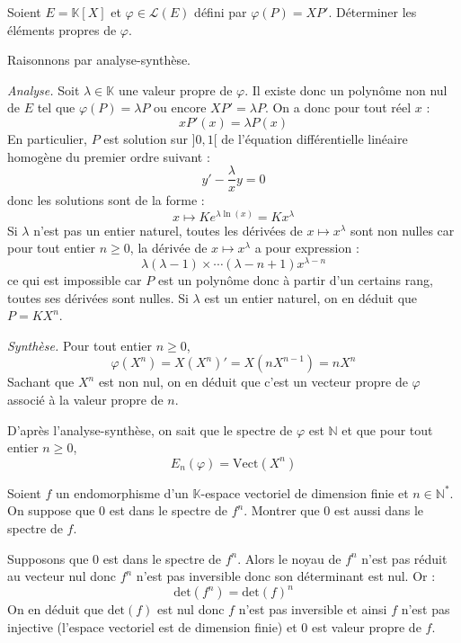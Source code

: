 \documentclass[a4paper,10pt]{report}
\begin{document}
\begin{Exercice}{} Soient $E = \mathbb{K}[X]$ et $\varphi \in \mathcal{L}(E)$ défini par $\varphi(P)=XP'$. Déterminer les éléments propres de $\varphi$.
\end{Exercice}

\corr Raisonnons par analyse-synthèse. 

\medskip

\noindent \textit{Analyse.} Soit $\lambda \in \mathbb{K}$ une valeur propre de $\varphi$. Il existe donc un polynôme non nul de $E$ tel que $\varphi(P)=\lambda P$ ou encore $XP' = \lambda P$. On a donc pour tout réel $x$ :
$$ x P'(x) = \lambda P(x)$$
En particulier, $P$ est solution sur $]0,1[$ de l'équation différentielle linéaire homogène du premier ordre suivant :
$$ y' - \dfrac{\lambda}{x} y = 0$$
donc les solutions sont de la forme :
$$ x \mapsto K e^{\lambda \ln(x)} = K x^{\lambda}$$
Si $\lambda$ n'est pas un entier naturel, toutes les dérivées de $x \mapsto x^{\lambda}$ sont non nulles car pour tout entier $n \geq 0$, la dérivée de $x \mapsto x^{\lambda}$ a pour expression :
$$ \lambda (\lambda-1) \times \cdots (\lambda-n+1) x^{\lambda -n}$$
ce qui est impossible car $P$ est un polynôme donc à partir d'un certains rang, toutes ses dérivées sont nulles. Si $\lambda$ est un entier naturel, on en déduit que $P= K X^n$.

\medskip

\noindent \textit{Synthèse.} Pour tout entier $n \geq 0$,
$$ \varphi(X^n) = X(X^n)'=X(nX^{n-1})=nX^n$$
Sachant que $X^n$ est non nul, on en déduit que c'est un vecteur propre de $\varphi$ associé à la valeur propre de $n$.

\medskip

\noindent D'après l'analyse-synthèse, on sait que le spectre de $\varphi$ est $\mathbb{N}$ et que pour tout entier $n \geq 0$,
$$ E_{n}(\varphi) = \textrm{Vect}(X^n)$$

\begin{Exercice}{} Soient $f$ un endomorphisme d'un $\mathbb{K}$-espace vectoriel de dimension finie et $n \in \mathbb{N}^{*}$. On suppose que $0$ est dans le spectre de $f^n$. Montrer que $0$ est aussi dans le spectre de $f$.
\end{Exercice}

\corr Supposons que $0$ est dans le spectre de $f^n$. Alors le noyau de $f^n$ n'est pas réduit au vecteur nul donc $f^n$ n'est pas inversible donc son déterminant est nul. Or :
$$ \textrm{det}(f^n) = \textrm{det}(f)^n$$
On en déduit que $\textrm{det}(f)$ est nul donc $f$ n'est pas inversible et ainsi $f$ n'est pas injective (l'espace vectoriel est de dimension finie) et $0$ est valeur propre de $f$.
\end{document}

